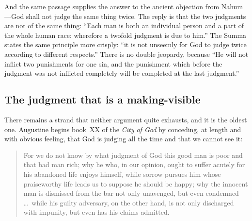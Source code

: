 And the same passage supplies the answer to the ancient objection from Nahum---God shall not judge the same thing twice. The reply is that the two judgments are not of the same thing: ``Each man is both an individual person and a part of the whole human race: wherefore a twofold judgment is due to him.'' The Summa states the same principle more crisply: ``it is not unseemly for God to judge twice according to different respects.'' There is no double jeopardy, because ``He will not inflict two punishments for one sin, and the punishment which before the judgment was not inflicted completely will be completed at the last judgment.''

\subsection{The judgment that is a making-visible}

There remains a strand that neither argument quite exhausts, and it is the oldest one. Augustine begins book~XX of the \emph{City of God} by conceding, at length and with obvious feeling, that God is judging all the time and that we cannot see it:

\begin{quote}
For we do not know by what judgment of God this good man is poor and that bad man rich; why he who, in our opinion, ought to suffer acutely for his abandoned life enjoys himself, while sorrow pursues him whose praiseworthy life leads us to suppose he should be happy; why the innocent man is dismissed from the bar not only unavenged, but even condemned \ldots\ while his guilty adversary, on the other hand, is not only discharged with impunity, but even has his claims admitted.
\end{quote}

